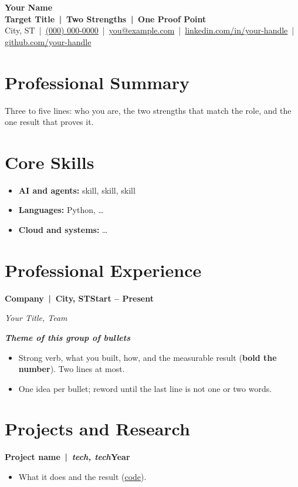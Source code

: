 \documentclass[letterpaper,11pt]{article}
\newcommand{\link}[2]{\href{#1}{\color{linkblue}#2}}
\newcommand{\entry}[2]{\textbf{#1}\hfill\textbf{#2}\par}
\newcommand{\subentry}[2]{\textit{#1}\hfill\textit{#2}\par}
\newcommand{\group}[1]{\vspace{3pt}\textbf{\textit{#1}}\par}
\begin{document}
\begin{center}
  {\fontsize{22}{26}\selectfont\bfseries Your Name}\\[3pt]
  {\bfseries Target Title \,|\, Two Strengths \,|\, One Proof Point}\\[2pt]
  {\fontsize{9.8}{12}\selectfont City, ST \,|\, \link{tel:+10000000000}{(000) 000-0000} \,|\,
  \link{mailto:you@example.com}{you@example.com} \,|\,
  \link{https://www.linkedin.com/in/your-handle}{linkedin.com/in/your-handle} \,|\,
  \link{https://github.com/your-handle}{github.com/your-handle}}
\end{center}
\vspace{-6pt}

\section{Professional Summary}
Three to five lines: who you are, the two strengths that match the role, and the one result that proves it.

\section{Core Skills}
\begin{itemize}[label={},leftmargin=1.2em,itemindent=-1.2em,itemsep=1pt]
  \item \textbf{AI and agents:} skill, skill, skill
  \item \textbf{Languages:} Python, \ldots
  \item \textbf{Cloud and systems:} \ldots
\end{itemize}

\section{Professional Experience}
\entry{Company \,|\, City, ST}{Start -- Present}
\subentry{Your Title, Team}{}
\group{Theme of this group of bullets}
\begin{itemize}
  \item Strong verb, what you built, how, and the measurable result (\textbf{bold the number}). Two lines at most.
  \item One idea per bullet; reword until the last line is not one or two words.
\end{itemize}

\section{Projects and Research}
\entry{Project name \,|\, \normalfont\textit{tech, tech}}{Year}
\begin{itemize}
  \item What it does and the result (\link{https://github.com/your-handle/project}{code}).
\end{itemize}
\end{document}
